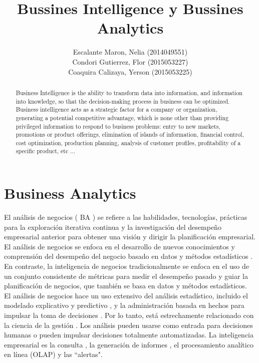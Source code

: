 \documentclass[preprint,12pt]{elsarticle}
\begin{document}
	
\begin{frontmatter}
		
		
		\title{\huge Bussines Intelligence y Bussines Analytics}
		
		
		\author{Escalante Maron, Nelia (2014049551)  
			\\Condori Gutierrez, Flor (2015053227)
		\\Coaquira Calizaya, Yerson (2015053225)    }
		
		\address{Tacna, Peru}
		
		\begin{abstract}
			Business Intelligence is the ability to transform data into information, and information into knowledge, so that the decision-making process in business can be optimized.
			Business intelligence acts as a strategic factor for a company or organization, generating a potential competitive advantage, which is none other than providing privileged information to respond to business problems: entry to new markets, promotions or product offerings, elimination of islands of information, financial control, cost optimization, production planning, analysis of customer profiles, profitability of a specific product, etc ...
			
		\end{abstract}
		
	\end{frontmatter}
	
	
	\section{Business Analytics}
	\label{S:1}
	
	El análisis de negocios ( BA ) se refiere a las habilidades, tecnologías, prácticas para la exploración iterativa continua y la investigación del desempeño empresarial anterior para obtener una visión y dirigir la planificación empresarial. El análisis de negocios se enfoca en el desarrollo de nuevos conocimientos y comprensión del desempeño del negocio basado en datos y métodos estadísticos . En contraste, la inteligencia de negocios tradicionalmente se enfoca en el uso de un conjunto consistente de métricas para medir el desempeño pasado y guiar la planificación de negocios, que también se basa en datos y métodos estadísticos.\\
	
	El análisis de negocios hace un uso extensivo del análisis estadístico, incluido el modelado explicativo y predictivo , y la administración basada en hechos para impulsar la toma de decisiones . Por lo tanto, está estrechamente relacionado con la ciencia de la gestión . Los análisis pueden usarse como entrada para decisiones humanas o pueden impulsar decisiones totalmente automatizadas. La inteligencia empresarial es la consulta , la generación de informes , el procesamiento analítico en línea (OLAP) y las ``alertas". \\
	
\end{document}
